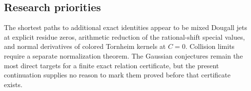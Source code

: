 \documentclass[11pt,a4paper]{article}
\numberwithin{equation}{section}
\theoremstyle{definition}
\theoremstyle{remark}
\begin{document}
\subsection{Research priorities}
The shortest paths to additional exact identities appear to be
mixed Dougall jets at explicit residue zeros, arithmetic reduction
of the rational-shift special values, and normal derivatives of
colored Tornheim kernels at $C=0$. Collision limits require a
separate normalization theorem. The Gaussian conjectures remain
the most direct targets for a finite exact relation certificate,
but the present continuation supplies no reason to mark them
proved before that certificate exists.


\end{document}
